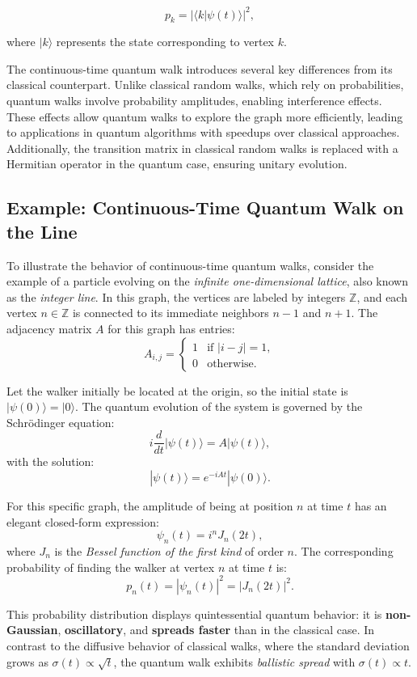 \documentclass[11pt]{article}
\theoremstyle{definition}
\begin{document}
\[
p_k = |\langle k | \psi(t) \rangle|^2,
\]

where \( |k\rangle \) represents the state corresponding to vertex \( k \).

The continuous-time quantum walk introduces several key differences from its classical counterpart. Unlike classical random walks, which rely on probabilities, quantum walks involve probability amplitudes, enabling interference effects. These effects allow quantum walks to explore the graph more efficiently, leading to applications in quantum algorithms with speedups over classical approaches. Additionally, the transition matrix in classical random walks is replaced with a Hermitian operator in the quantum case, ensuring unitary evolution.



\subsection*{Example: Continuous-Time Quantum Walk on the Line}

To illustrate the behavior of continuous-time quantum walks, consider the example of a particle evolving on the \textit{infinite one-dimensional lattice}, also known as the \textit{integer line}. In this graph, the vertices are labeled by integers \( \mathbb{Z} \), and each vertex \( n \in \mathbb{Z} \) is connected to its immediate neighbors \( n-1 \) and \( n+1 \). The adjacency matrix \( A \) for this graph has entries:
\[
A_{i,j} =
\begin{cases}
1 & \text{if } |i - j| = 1, \\
0 & \text{otherwise}.
\end{cases}
\]

Let the walker initially be located at the origin, so the initial state is \( |\psi(0)\rangle = |0\rangle \). The quantum evolution of the system is governed by the Schrödinger equation:
\[
i \frac{d}{dt} |\psi(t)\rangle = A |\psi(t)\rangle,
\]
with the solution:
\[
|\psi(t)\rangle = e^{-iAt} |\psi(0)\rangle.
\]

For this specific graph, the amplitude of being at position \( n \) at time \( t \) has an elegant closed-form expression:
\[
\psi_n(t) = i^n J_n(2t),
\]
where \( J_n \) is the \textit{Bessel function of the first kind} of order \( n \). The corresponding probability of finding the walker at vertex \( n \) at time \( t \) is:
\[
p_n(t) = |\psi_n(t)|^2 = |J_n(2t)|^2.
\]

This probability distribution displays quintessential quantum behavior: it is \textbf{non-Gaussian}, \textbf{oscillatory}, and \textbf{spreads faster} than in the classical case. In contrast to the diffusive behavior of classical walks, where the standard deviation grows as \( \sigma(t) \propto \sqrt{t} \), the quantum walk exhibits \textit{ballistic spread} with \( \sigma(t) \propto t \).
\end{document}
